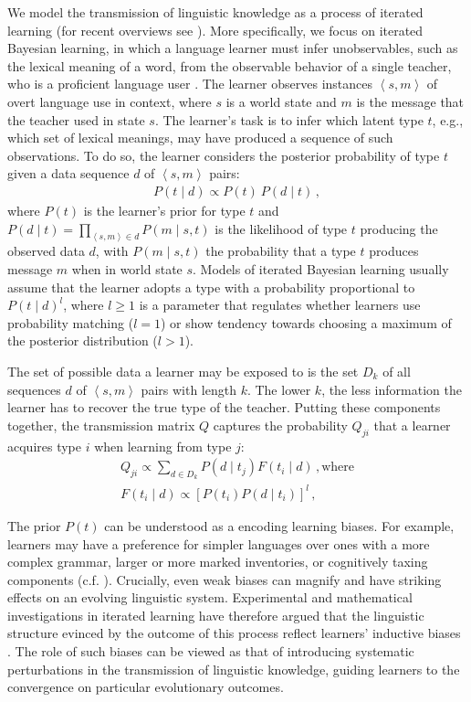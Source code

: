 \documentclass[10pt,a4paper]{article}
\newcommand{\tuple}[1]{\ensuremath{\left\langle #1 \right\rangle}}
\begin{document}
We model the transmission of linguistic knowledge as a process of iterated learning (for recent
overviews see \citealt{kirby+etal:2014, tamariz+kirby:2016}). More specifically, we focus on
iterated Bayesian learning, in which a language learner must infer unobservables, such as the
lexical meaning of a word, from the observable behavior of a single teacher, who is a
proficient language user \citep[e.g.][]{griffiths+kalish:2007,kirby+etal:2007}. The learner
observes instances $\tuple{s,m}$ of overt language use in context, where $s$ is a world state
and $m$ is the message that the teacher used in state $s$. The learner's task is to infer which
latent type $t$, e.g., which set of lexical meanings, may have produced a sequence of such
observations. To do so, the learner considers the posterior probability of type $t$ given a
data sequence $d$ of $\tuple{s, m}$ pairs:
\begin{align*}
  P(t \mid d) \propto P(t) \ P(d \mid t)\,,
\end{align*}
where $P(t)$ is the learner's prior for type $t$ and
$P(d \mid t) = \prod_{\tuple{s,m} \in d} P(m \mid s, t)$ is the likelihood of type $t$
producing the observed data $d$, with $P(m \mid s, t)$ the probability that a type $t$ produces
message $m$ when in world state $s$. Models of iterated Bayesian learning usually assume that
the learner adopts a type with a probability proportional to $P(t \mid d)^l$, where $l \ge 1$
is a parameter that regulates whether learners use probability matching ($l = 1$) or show
tendency towards choosing a maximum of the posterior distribution ($l > 1$). 

The set of possible data a learner may be exposed to is the set $D_k$ of all sequences $d$  of $\tuple{s,m}$ pairs with
length $k$. The lower $k$, the less information the learner has to
recover the true type of the teacher. Putting these components together, the transmission matrix $Q$ captures the probability $Q_{ji}$
that a learner acquires type $i$ when learning from type $j$:
\begin{align*}
  Q_{ji} \propto \sum_{d \in D_k} P(d \mid t_j) F(t_i \mid d)\,, \text{where} \\
  F(t_i \mid d) \propto [P(t_i) P(d \mid t_i)]^l\,,
\end{align*}


The prior $P(t)$ can be understood as a encoding learning biases. For example, learners may
have a preference for simpler languages over ones with a more complex grammar, larger or more
marked inventories, or cognitively taxing components
(c.f. \citealt{feldman:2000,chater+vitanyi:2003, kirby+etal:2015}). Crucially, even weak biases
can magnify and have striking effects on an evolving linguistic system. Experimental and
mathematical investigations in iterated learning have therefore argued that the linguistic
structure evinced by the outcome of this process reflect learners' inductive biases
\citep{kirby+etal:2007,kirby+etal:2014}. The role of such biases can be viewed as that of
introducing systematic perturbations in the transmission of linguistic knowledge, guiding
learners to the convergence on particular evolutionary outcomes.
\end{document}
